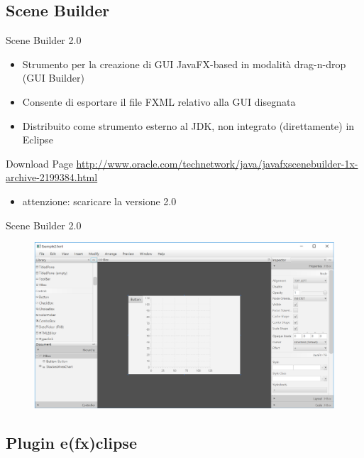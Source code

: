 \documentclass[presentation]{beamer}
\begin{document}
\subsection{Scene Builder}

\begin{frame}{Scene Builder 2.0}
\begin{itemize}\itemsep10pt
\item Strumento per la creazione di GUI JavaFX-based in modalità drag-n-drop (GUI Builder)
\item Consente di esportare il file FXML relativo alla GUI disegnata
\item Distribuito come strumento esterno al JDK, non integrato (direttamente) in Eclipse
\end{itemize}
\begin{block}{Download Page}
\url{http://www.oracle.com/technetwork/java/javafxscenebuilder-1x-archive-2199384.html}
\begin{itemize}
\item attenzione: scaricare la versione 2.0
\end{itemize}
\end{block}
\end{frame}

\begin{frame}{Scene Builder 2.0}
\begin{figure}
\includegraphics[width=\textwidth]{img/scenebuilder.png}
\end{figure}
\end{frame}

\subsection{Plugin e(fx)clipse}
\end{document}

